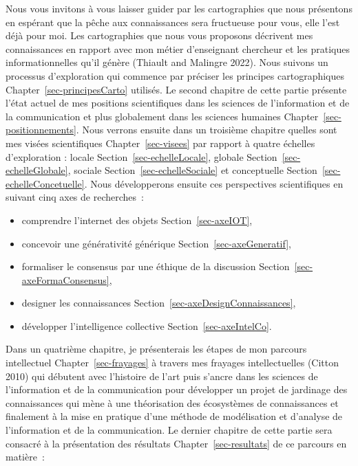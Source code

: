 \documentclass[
  letterpaper,
  DIV=11,
  numbers=noendperiod]{scrreprt}
\providecommand{\tightlist}{%
  \setlength{\itemsep}{0pt}\setlength{\parskip}{0pt}}\usepackage{longtable,booktabs,array}
\begin{document}
Nous vous invitons à vous laisser guider par les cartographies que nous
présentons en espérant que la pêche aux connaissances sera fructueuse
pour vous, elle l'est déjà pour moi. Les cartographies que nous vous
proposons décrivent mes connaissances en rapport avec mon métier
d'enseignant chercheur et les pratiques informationnelles qu'il génère
(Thiault and Malingre 2022). Nous suivons un processus d'exploration qui
commence par préciser les principes cartographiques
Chapter~\ref{sec-principesCarto} utilisés. Le second chapitre de cette
partie présente l'état actuel de mes positions scientifiques dans les
sciences de l'information et de la communication et plus globalement
dans les sciences humaines Chapter~\ref{sec-positionnements}. Nous
verrons ensuite dans un troisième chapitre quelles sont mes visées
scientifiques Chapter~\ref{sec-visees} par rapport à quatre échelles
d'exploration : locale Section~\ref{sec-echelleLocale}, globale
Section~\ref{sec-echelleGlobale}, sociale
Section~\ref{sec-echelleSociale} et conceptuelle
Section~\ref{sec-echelleConcetuelle}. Nous développerons ensuite ces
perspectives scientifiques en suivant cinq axes de recherches~:

\begin{itemize}
\tightlist
\item
  comprendre l'internet des objets Section~\ref{sec-axeIOT},
\item
  concevoir une générativité générique Section~\ref{sec-axeGeneratif},
\item
  formaliser le consensus par une éthique de la discussion
  Section~\ref{sec-axeFormaConsensus},
\item
  designer les connaissances Section~\ref{sec-axeDesignConnaissances},
\item
  développer l'intelligence collective Section~\ref{sec-axeIntelCo}.
\end{itemize}

Dans un quatrième chapitre, je présenterais les étapes de mon parcours
intellectuel Chapter~\ref{sec-frayages} à travers mes frayages
intellectuelles (Citton 2010) qui débutent avec l'histoire de l'art puis
s'ancre dans les sciences de l'information et de la communication pour
développer un projet de jardinage des connaissances qui mène à une
théorisation des écosystèmes de connaissances et finalement à la mise en
pratique d'une méthode de modélisation et d'analyse de l'information et
de la communication. Le dernier chapitre de cette partie sera consacré à
la présentation des résultats Chapter~\ref{sec-resultats} de ce parcours
en matière~:
\end{document}
